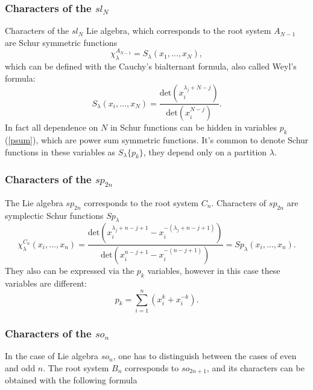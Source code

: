 \documentclass{article}
\begin{document}
\subsubsection{Characters of the $sl_N$}
Characters of the $sl_N$ Lie algebra, which corresponds to the root system $A_{N-1}$ are Schur symmetric functions
\begin{equation}
    \chi_{\lambda}^{A_{N-1}} = S_{\lambda}(x_1, \dots, x_N),
\end{equation}
which can be defined with the Cauchy's bialternant formula, also called Weyl's formula:
\begin{equation}
    S_{\lambda}(x_i,\dots,x_N) = \frac{\text{det}\left(x_i^{\lambda_j+N-j}\right)}{\text{det}\left(x_i^{N-j}\right)}.
\end{equation}
In fact all dependence on $N$ in Schur functions can be hidden in variables $p_k$ (\ref{psum}), which are power sum symmetric functions. It's common to denote Schur functions in these variables as $S_{\lambda}\{p_k\}$, they depend only on a partition $\lambda$.



\subsubsection{Characters of the $sp_{2n}$}
The Lie algebra $sp_{2n}$ corresponds to the root system $C_n$. Characters of $sp_{2n}$ are symplectic Schur functions $ Sp_{\lambda}$ \cite{Schurs,JT}
\begin{equation}
   \chi_{\lambda}^{C_n} (x_i,\dots,x_n) = \frac{\text{det}\left(x_i^{\lambda_j+n-j+1}-x_i^{-(\lambda_j+n-j+1)}\right)}{\text{det}\left(x_i^{n-j+1}-x_i^{-(n-j+1)}\right)} = Sp_{\lambda}(x_i,\dots,x_n) .
\end{equation}
They also can be expressed via the $p_k$ variables, however in this case these variables are different:
\begin{equation}
    p_k = \sum_{i=1}^{n} \left(x_i^k +x_i^{-k} \right).
\end{equation}

\subsubsection{Characters of the $so_{n}$}
In the case of Lie algebra $so_n$, one has to distinguish between the cases of even and odd $n$. The root system $B_n$ corresponds to $so_{2n+1}$, and its characters can be obtained with the following formula
\end{document}

